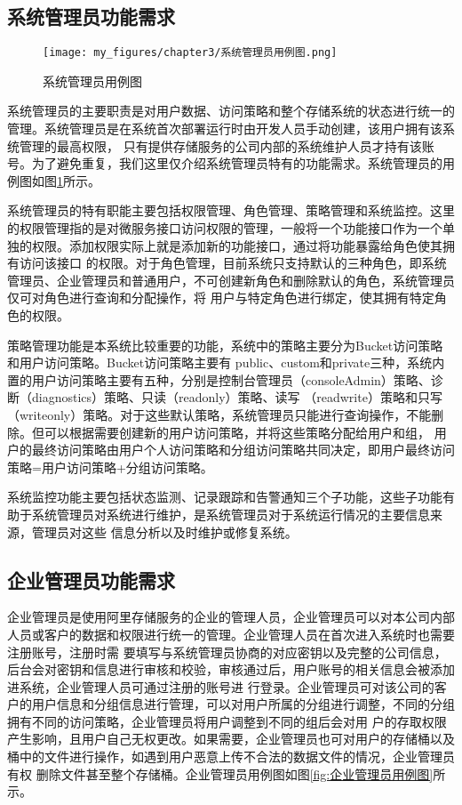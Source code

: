\subsection{系统管理员功能需求}

\begin{figure}[h]
    \centering
    \texttt{[image: my\_figures/chapter3/系统管理员用例图.png]}
    \caption{系统管理员用例图}
    \label{fig:系统管理员用例图}
\end{figure}

系统管理员的主要职责是对用户数据、访问策略和整个存储系统的状态进行统一的管理。系统管理员是在系统首次部署运行时由开发人员手动创建，该用户拥有该系统管理的最高权限，
只有提供存储服务的公司内部的系统维护人员才持有该账号。为了避免重复，我们这里仅介绍系统管理员特有的功能需求。系统管理员的用例图如图\ref{fig:系统管理员用例图}所示。


系统管理员的特有职能主要包括权限管理、角色管理、策略管理和系统监控。这里的权限管理指的是对微服务接口访问权限的管理，一般将一个功能接口作为一个单独的权限。添加权限实际上就是添加新的功能接口，通过将功能暴露给角色使其拥有访问该接口
的权限。对于角色管理，目前系统只支持默认的三种角色，即系统管理员、企业管理员和普通用户，不可创建新角色和删除默认的角色，系统管理员仅可对角色进行查询和分配操作，将
用户与特定角色进行绑定，使其拥有特定角色的权限。

策略管理功能是本系统比较重要的功能，系统中的策略主要分为Bucket访问策略和用户访问策略。Bucket访问策略主要有
public、custom和private三种\cite{koi2keji}，系统内置的用户访问策略主要有五种，分别是控制台管理员（consoleAdmin）策略、诊断（diagnostics）策略、只读（readonly）策略、读写
（readwrite）策略和只写（writeonly）策略\cite{kongqingyi}。对于这些默认策略，系统管理员只能进行查询操作，不能删除。但可以根据需要创建新的用户访问策略，并将这些策略分配给用户和组，
用户的最终访问策略由用户个人访问策略和分组访问策略共同决定，即用户最终访问策略=用户访问策略+分组访问策略。

系统监控功能主要包括状态监测、记录跟踪和告警通知三个子功能，这些子功能有助于系统管理员对系统进行维护，是系统管理员对于系统运行情况的主要信息来源，管理员对这些
信息分析以及时维护或修复系统。

\subsection{企业管理员功能需求}

企业管理员是使用阿里存储服务的企业的管理人员，企业管理员可以对本公司内部人员或客户的数据和权限进行统一的管理。企业管理人员在首次进入系统时也需要注册账号，注册时需
要填写与系统管理员协商的对应密钥以及完整的公司信息，后台会对密钥和信息进行审核和校验，审核通过后，用户账号的相关信息会被添加进系统，企业管理人员可通过注册的账号进
行登录。企业管理员可对该公司的客户的用户信息和分组信息进行管理，可以对用户所属的分组进行调整，不同的分组拥有不同的访问策略，企业管理员将用户调整到不同的组后会对用
户的存取权限产生影响，且用户自己无权更改。如果需要，企业管理员也可对用户的存储桶以及桶中的文件进行操作，如遇到用户恶意上传不合法的数据文件的情况，企业管理员有权
删除文件甚至整个存储桶\cite{kqingg201eji}。企业管理员用例图如图\ref{fig:企业管理员用例图}所示。

